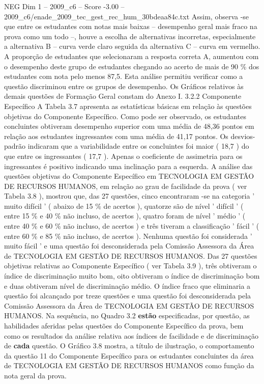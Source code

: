 \begin{textsample}{NEG Dim 1 – 2009\_c6 – Score -3.00 – 2009\_c6/enade\_2009\_tec\_gest\_rec\_hum\_30bdeaa84c.txt}
Assim, observa -se que entre os estudantes com notas mais baixas – desempenho geral mais fraco na prova como um todo –, houve a escolha de alternativas incorretas, especialmente a alternativa B – curva verde claro seguida da alternativa C – curva em vermelho.
A proporção de estudantes que selecionaram a resposta correta A, aumentou com o desempenho deste grupo de estudantes chegando ao acerto de mais de 90 \% dos estudantes com nota pelo menos 87,5.
Esta análise permitiu verificar como a questão discriminou entre os grupos de desempenho.
Os Gráficos relativos às demais questões de Formação Geral constam do Anexo I. 3.2.2 Componente Específico A Tabela 3.7 apresenta as estatísticas básicas em relação às questões objetivas do Componente Específico.
Como pode ser observado, os estudantes concluintes obtiveram desempenho superior com uma média de 48,36 pontos em relação aos estudantes ingressantes com uma média de 41,17 pontos.
Os desvios-padrão indicaram que a variabilidade entre os concluintes foi maior ( 18,7 ) do que entre os ingressantes ( 17,7 ).
Apenas o coeficiente de assimetria para os ingressantes é positivo indicando uma inclinação para a esquerda.
A análise das questões objetivas do Componente Específico em TECNOLOGIA EM GESTÃO DE RECURSOS HUMANOS, em relação ao grau de facilidade da prova ( ver Tabela 3.8 ), mostrou que, das 27 questões, cinco encontraram -se na categoria ' muito difícil ' ( abaixo de 15 \% de acertos ), quatorze são de nível ' difícil ' ( entre 15 \% e 40 \% não incluso, de acertos ), quatro foram de nível ' médio ' ( entre 40 \% e 60 \% não incluso, de acertos ) e três tiveram a classificação ' fácil ' ( entre 60 \% e 85 \% não incluso, de acertos ).
Nenhuma questão foi considerada ' muito fácil ' e uma questão foi desconsiderada pela Comissão Assessora da Área de TECNOLOGIA EM GESTÃO DE RECURSOS HUMANOS.
Das 27 questões objetivas relativas ao Componente Específico ( ver Tabela 3.9 ), três obtiveram o índice de discriminação muito bom, oito obtiveram o índice de discriminação bom e duas obtiveram nível de discriminação médio.
O índice fraco que eliminaria a questão foi alcançado por treze questões e uma questão foi desconsiderada pela Comissão Assessora da Área de TECNOLOGIA EM GESTÃO DE RECURSOS HUMANOS.
Na sequência, no Quadro 3.2 \textbf{estão} especificadas, por questão, as habilidades aferidas pelas questões do Componente Específico da prova, bem como os resultados da análise relativa aos índices de facilidade e de discriminação de \textbf{cada} questão.
O Gráfico 3.8 mostra, a título de ilustração, o comportamento da questão 11 do Componente Específico para os estudantes concluintes da área de TECNOLOGIA EM GESTÃO DE RECURSOS HUMANOS como função da nota geral da prova.

\end{textsample}
